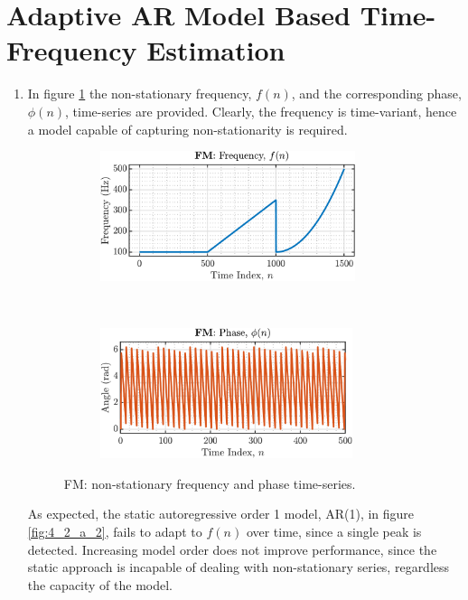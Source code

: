 \section{Adaptive AR Model Based Time-Frequency Estimation}

\begin{enumerate}[label=\alph*), leftmargin=*]

\item
%

In figure \ref{fig:4_2_a_1} the non-stationary frequency, $f(n)$, and the corresponding phase, $\phi(n)$, time-series are provided.
Clearly, the frequency is time-variant, hence a model capable of capturing non-stationarity is required.

\begin{figure}[h]
    \centering
    \begin{subfigure}{0.49\textwidth}
        \centering
        \includegraphics[height=1.5in]{report/widely-linear-filtering-and-adaptive-spectrum-estimation/adaptive-AR-model-based-time-frequency-estimation/assets/a/frequency}
    \end{subfigure}
    ~
    \begin{subfigure}{0.49\textwidth}
        \centering
        \includegraphics[height=1.5in]{report/widely-linear-filtering-and-adaptive-spectrum-estimation/adaptive-AR-model-based-time-frequency-estimation/assets/a/phase}
    \end{subfigure}
    \caption{FM: non-stationary frequency and phase time-series.}
    \label{fig:4_2_a_1}
\end{figure}

As expected, the static autoregressive order 1 model, AR(1), in figure \ref{fig:4_2_a_2}, fails to adapt to $f(n)$ over time, since a single peak is detected.
Increasing model order does not improve performance, since the static approach is incapable of dealing with non-stationary series, regardless the capacity of the model.


\end{enumerate}
